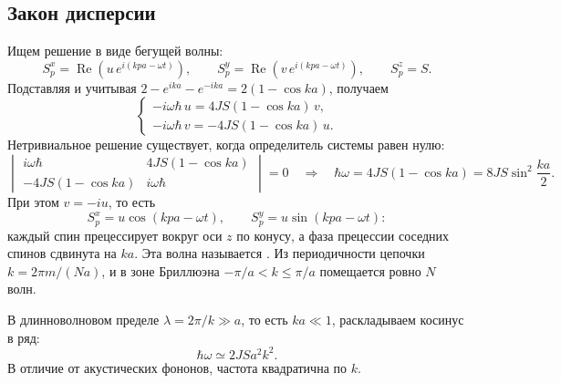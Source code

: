 \documentclass[../final.tex]{subfiles}
\begin{document}
\subsection*{Закон дисперсии}
Ищем решение в виде бегущей волны:
\[
 S_p^x=\operatorname{Re}\left(u\,e^{i(kpa-\omega t)}\right),\qquad
 S_p^y=\operatorname{Re}\left(v\,e^{i(kpa-\omega t)}\right),\qquad
 S_p^z=S.
\]
Подставляя и учитывая $2-e^{ika}-e^{-ika}=2(1-\cos ka)$, получаем
\[
 \begin{cases}
  -i\omega\hbar\,u=4JS(1-\cos ka)\,v,\\
  -i\omega\hbar\,v=-4JS(1-\cos ka)\,u.
 \end{cases}
\]
Нетривиальное решение существует, когда определитель системы равен нулю:
\[
 \begin{vmatrix}
  i\omega\hbar & 4JS(1-\cos ka)\\
  -4JS(1-\cos ka) & i\omega\hbar
 \end{vmatrix}=0
 \quad\Longrightarrow\quad
 \hbar\omega=4JS(1-\cos ka)=8JS\sin^2\frac{ka}2.
\]
При этом $v=-iu$, то есть
\[
 S_p^x=u\cos(kpa-\omega t),\qquad S_p^y=u\sin(kpa-\omega t):
\]
каждый спин прецессирует вокруг оси $z$ по конусу, а фаза прецессии
соседних спинов сдвинута на $ka$. Эта волна называется
. Из периодичности цепочки
$k=2\pi m/(Na)$, и в зоне Бриллюэна $-\pi/a<k\le\pi/a$ помещается
ровно $N$ волн.

В длинноволновом пределе $\lambda=2\pi/k\gg a$, то есть $ka\ll1$,
раскладываем косинус в ряд:
\[
 \hbar\omega\simeq2JSa^2k^2.
\]
В отличие от акустических фононов, частота квадратична по $k$.
\end{document}
